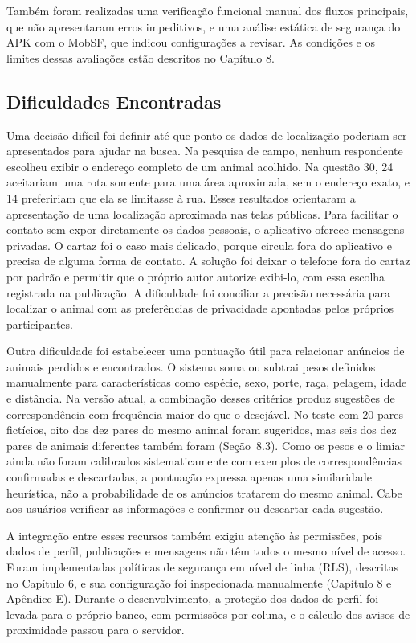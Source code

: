 Também foram realizadas uma verificação funcional manual dos fluxos principais, que não apresentaram erros impeditivos, e uma análise estática de segurança do APK com o MobSF, que indicou configurações a revisar. As condições e os limites dessas avaliações estão descritos no Capítulo 8.

\subsection{Dificuldades Encontradas}

Uma decisão difícil foi definir até que ponto os dados de localização poderiam ser apresentados para ajudar na busca. Na pesquisa de campo, nenhum respondente escolheu exibir o endereço completo de um animal acolhido. Na questão 30, 24 aceitariam uma rota somente para uma área aproximada, sem o endereço exato, e 14 prefeririam que ela se limitasse à rua. Esses resultados orientaram a apresentação de uma localização aproximada nas telas públicas. Para facilitar o contato sem expor diretamente os dados pessoais, o aplicativo oferece mensagens privadas. O cartaz foi o caso mais delicado, porque circula fora do aplicativo e precisa de alguma forma de contato. A solução foi deixar o telefone fora do cartaz por padrão e permitir que o próprio autor autorize exibi-lo, com essa escolha registrada na publicação. A dificuldade foi conciliar a precisão necessária para localizar o animal com as preferências de privacidade apontadas pelos próprios participantes.

Outra dificuldade foi estabelecer uma pontuação útil para relacionar anúncios de animais perdidos e encontrados. O sistema soma ou subtrai pesos definidos manualmente para características como espécie, sexo, porte, raça, pelagem, idade e distância. Na versão atual, a combinação desses critérios produz sugestões de correspondência com frequência maior do que o desejável. No teste com 20 pares fictícios, oito dos dez pares do mesmo animal foram sugeridos, mas seis dos dez pares de animais diferentes também foram (Seção~8.3). Como os pesos e o limiar ainda não foram calibrados sistematicamente com exemplos de correspondências confirmadas e descartadas, a pontuação expressa apenas uma similaridade heurística, não a probabilidade de os anúncios tratarem do mesmo animal. Cabe aos usuários verificar as informações e confirmar ou descartar cada sugestão.

A integração entre esses recursos também exigiu atenção às permissões, pois dados de perfil, publicações e mensagens não têm todos o mesmo nível de acesso. Foram implementadas políticas de segurança em nível de linha (RLS), descritas no Capítulo 6, e sua configuração foi inspecionada manualmente (Capítulo 8 e Apêndice E). Durante o desenvolvimento, a proteção dos dados de perfil foi levada para o próprio banco, com permissões por coluna, e o cálculo dos avisos de proximidade passou para o servidor.

